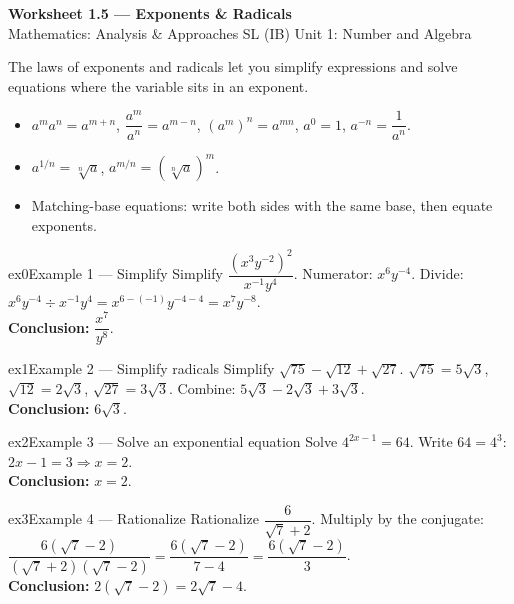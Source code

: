 \documentclass[11pt]{article}
\begin{document}
\begin{center}
{\LARGE\bfseries\color{titleblue}Worksheet 1.5 --- Exponents \& Radicals}\\[2pt]
{\small Mathematics: Analysis \& Approaches SL (IB) \textperiodcentered{} Unit 1: Number and Algebra}
\end{center}

\begin{ideabox}
The laws of exponents and radicals let you simplify expressions and solve equations where the variable sits in an exponent.
\begin{itemize}[leftmargin=*,itemsep=2pt]
  \item $a^ma^n=a^{m+n}$, $\dfrac{a^m}{a^n}=a^{m-n}$, $(a^m)^n=a^{mn}$, $a^0=1$, $a^{-n}=\dfrac1{a^n}$.
  \item $a^{1/n}=\sqrt[n]{a}$, $a^{m/n}=\left(\sqrt[n]{a}\right)^m$.
  \item Matching-base equations: write both sides with the same base, then equate exponents.
\end{itemize}
\end{ideabox}


\begin{example}{ex0}{Example 1 --- Simplify}
Simplify $\dfrac{(x^3y^{-2})^2}{x^{-1}y^4}$.\soln
Numerator: $x^6y^{-4}$. Divide: $x^6y^{-4}\div x^{-1}y^4=x^{6-(-1)}y^{-4-4}=x^7y^{-8}$.\\[3pt]\textbf{Conclusion:} $\dfrac{x^7}{y^8}$.
\end{example}

\begin{example}{ex1}{Example 2 --- Simplify radicals}
Simplify $\sqrt{75}-\sqrt{12}+\sqrt{27}$.\soln
$\sqrt{75}=5\sqrt3$, $\sqrt{12}=2\sqrt3$, $\sqrt{27}=3\sqrt3$. Combine: $5\sqrt3-2\sqrt3+3\sqrt3$.\\[3pt]\textbf{Conclusion:} $6\sqrt3$.
\end{example}

\begin{example}{ex2}{Example 3 --- Solve an exponential equation}
Solve $4^{2x-1}=64$.\soln
Write $64=4^3$: $2x-1=3\Rightarrow x=2$.\\[3pt]\textbf{Conclusion:} $x=2$.
\end{example}

\begin{example}{ex3}{Example 4 --- Rationalize}
Rationalize $\dfrac{6}{\sqrt7+2}$.\soln
Multiply by the conjugate: $\dfrac{6(\sqrt7-2)}{(\sqrt7+2)(\sqrt7-2)}=\dfrac{6(\sqrt7-2)}{7-4}=\dfrac{6(\sqrt7-2)}{3}$.\\[3pt]\textbf{Conclusion:} $2(\sqrt7-2)=2\sqrt7-4$.
\end{example}
\end{document}
